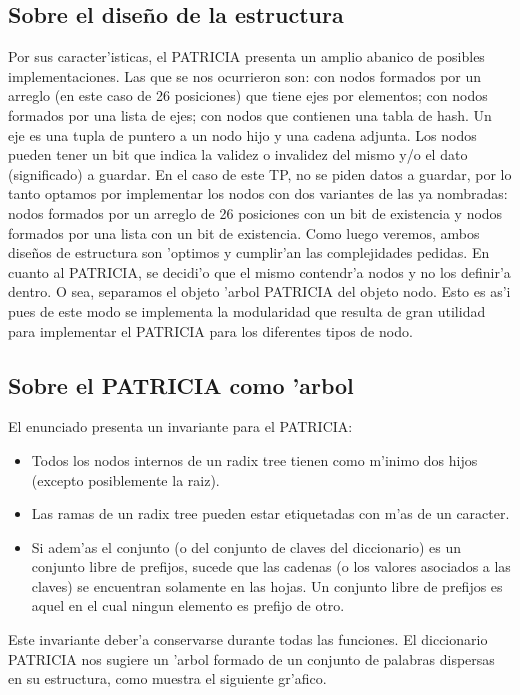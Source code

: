 \subsection{Sobre el dise\~{n}o de la estructura}
Por sus caracter'isticas, el PATRICIA presenta un amplio abanico de posibles implementaciones. Las que se nos ocurrieron son: con nodos formados por un arreglo (en este caso de 26 posiciones) que tiene ejes por elementos; con nodos formados por una lista de ejes; con nodos que contienen una tabla de hash. Un eje es una tupla de puntero a un nodo hijo y una cadena adjunta. Los nodos pueden tener un bit que indica la validez o invalidez del mismo y/o el dato (significado) a guardar. En el caso de este TP, no se piden datos a guardar, por lo tanto optamos por implementar los nodos con dos variantes de las ya nombradas: nodos formados por un arreglo de 26 posiciones con un bit de existencia y nodos formados por una lista con un bit de existencia. Como luego veremos, ambos dise\~{n}os de estructura son 'optimos y cumplir'an las complejidades pedidas.
En cuanto al PATRICIA, se decidi'o que el mismo contendr'a nodos y no los definir'a dentro. O sea, separamos el objeto 'arbol PATRICIA del objeto nodo. Esto es as'i pues de este modo se implementa la modularidad que resulta de gran utilidad para implementar el PATRICIA para los diferentes tipos de nodo.

\subsection{Sobre el PATRICIA como 'arbol}
El enunciado presenta un invariante para el PATRICIA: 
\begin{itemize}
\item Todos los nodos internos de un radix tree tienen como m'inimo dos hijos (excepto
posiblemente la raiz).
\item Las ramas de un radix tree pueden estar etiquetadas con m'as de un caracter.
\item Si adem'as el conjunto (o del conjunto de claves del diccionario) es un conjunto libre
de prefijos, sucede que las cadenas (o los valores asociados a las claves) se encuentran
solamente en las hojas. Un conjunto libre de prefijos es aquel en el cual ningun elemento
es prefijo de otro.
\end{itemize}
Este invariante deber'a conservarse durante todas las funciones.
El diccionario PATRICIA nos sugiere un 'arbol formado de un conjunto de palabras dispersas en su estructura, como muestra el siguiente gr'afico.

